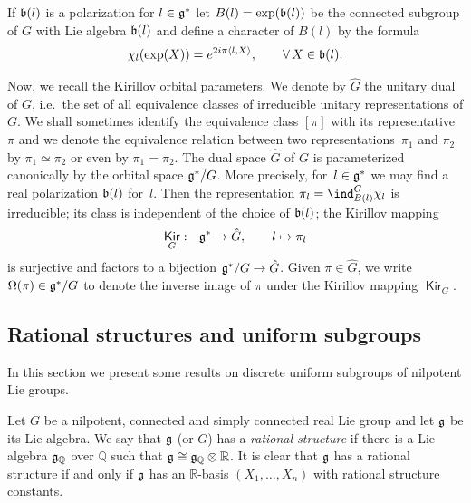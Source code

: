 \documentclass[11pt]{article}
\providecommand{\mathds}[1]{\mathbb{#1}}
\DeclareMathOperator{\kir}{\sans{Kir}}
\newcommand{\sans}[1]{\mathsf{#1}}
\begin{document}
If $\frak b(l)$ is a polarization for $l\in \frak g^*$ let
$B(l)=\exp(\frak b(l))$ be the connected subgroup of $G$ with Lie
algebra $\frak b(l)$ and def\/ine a character of $B(l)$ by the formula
\begin{gather*}%
\chi_l(\exp(X))= e^{2i \pi \langle l, X\rangle},\qquad \forall\, X\in \frak b(l).
\end{gather*}



Now, we recall the Kirillov orbital parameters. We denote by $\hat
G$ the unitary dual of $G$, i.e.\ the set of all equivalence classes
of irreducible unitary representations of $G$. We shall sometimes
identify the equivalence class $[\pi]$ with its representative $\pi$
and we denote the equivalence relation between two representations~$\pi_1$ and $\pi_2$ by $\pi_1 \simeq \pi_2$ or even by $\pi_1 =
\pi_2$.  The dual space $\hat G$ of $G$ is parameterized canonically
by the orbital space $\frak g^*/G$. More precisely, for~$l \in \frak
g^*$ we may f\/ind a real polarization $\frak b(l)$ for~$l$.
 Then the representation $\pi_l =
\ind_{B(l)}^G \chi_l$ is irreducible; its class is independent of
the choice of $\frak b(l)$; the Kirillov mapping
\begin{gather*}
\kir_G:  \ \ \frak g^* \rightarrow \hat G,\qquad  l \mapsto\pi_l
\end{gather*}
 is surjective and factors to a
bijection $\frak g^*/G \rightarrow \hat G$. Given $\pi \in \hat G$, we write $\Omega(\pi) \in \frak g^*/G$ to denote the inverse
image of $\pi$ under the Kirillov mapping $\kir_G$.


\subsection{Rational structures and uniform subgroups}\label{section2.3}

 In this section we present some results on discrete uniform
subgroups of nilpotent Lie groups.


 Let $G$ be a nilpotent, connected
and simply connected real Lie group and let $\frak g$ be its Lie
algebra. We say that $\frak g$ (or $G$) has a \textit{rational
structure} if there is a Lie algebra $\frak g_\mathds{Q}$ over
$\mathds{Q}$ such that $\frak g \cong \frak g_\mathds{Q} \otimes
\mathds{R}$. It is clear that $\frak g$ has a rational structure if
and only if $\frak g$ has an $ \mathds{R}$-basis $(X_1,\dots,X_n)$
with rational structure constants.
\end{document}
